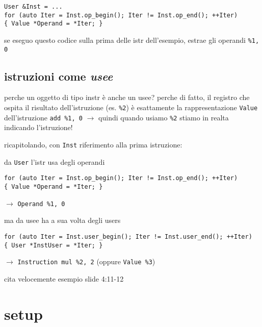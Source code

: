 \begin{lstlisting}
User &Inst = ...
for (auto Iter = Inst.op_begin(); Iter != Inst.op_end(); ++Iter)
{ Value *Operand = *Iter; }\end{lstlisting}

se eseguo questo codice sulla prima delle istr dell'esempio, estrae gli operandi \lstinline|%1, 0|

\subsection{istruzioni come \textit{usee}}

perche un oggetto di tipo instr \`e anche un usee? perche di fatto, il registro che ospita il risultato dell'istruzione (es. \lstinline|%2|) \`e esattamente la rappresentazione \lstinline|Value| dell'istruzione \lstinline|add %1, 0| $\rightarrow$ quindi quando usiamo \lstinline|%2| stiamo in realta indicando l'istruzione!

ricapitolando, con \lstinline|Inst| riferimento alla prima istruzione:

da \lstinline|User| l'istr usa degli operandi
\begin{lstlisting}
for (auto Iter = Inst.op_begin(); Iter != Inst.op_end(); ++Iter)
{ Value *Operand = *Iter; }\end{lstlisting}
$\rightarrow$ \lstinline|Operand %1, 0|

ma da usee ha a sua volta degli users
\begin{lstlisting}
for (auto Iter = Inst.user_begin(); Iter != Inst.user_end(); ++Iter)
{ User *InstUser = *Iter; }\end{lstlisting}
$\rightarrow$ \lstinline|Instruction mul %2, 2| (oppure \lstinline|Value %3|)

cita velocemente esempio slide 4:11-12

\section{setup}

